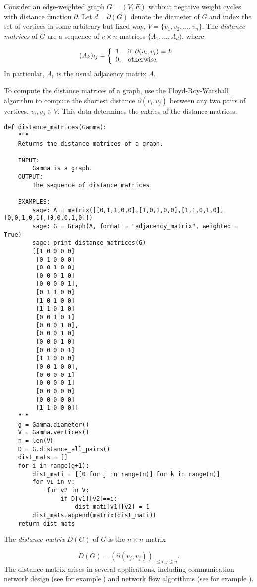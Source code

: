 Consider an edge-weighted graph $G=(V,E)$ without negative weight
cycles with distance function $\partial$. Let $d=\partial(G)$
denote the diameter of $G$ and index the
set of vertices in some arbitrary but fixed way,
$V=\{v_1,v_2,\dots, v_n\}$.
The {\it distance matrices} of $G$ are a sequence of $n\times n$ matrices
$\{A_1,\dots, A_d)$, where

\[
(A_k)_{ij} =
\left\{
\begin{array}{ll}
1,& {\rm if}\ \partial(v_i,v_j)=k,\\
0,& {\rm otherwise}.
\end{array}
\right.
\]
In particular, $A_1$ is the usual adjacency matrix $A$.

To compute the distance matrices of a graph, use the Floyd-Roy-Warshall
algorithm to compute the shortest distance
$\partial(v_i,v_j)$ between any two pairs of vertices,
$v_i,v_j\in V$. This data determines the entries of
the distance matrices.

\begin{lstlisting}
def distance_matrices(Gamma):
    """
    Returns the distance matrices of a graph.

    INPUT:
        Gamma is a graph.
    OUTPUT:
        The sequence of distance matrices

    EXAMPLES:
        sage: A = matrix([[0,1,1,0,0],[1,0,1,0,0],[1,1,0,1,0],[0,0,1,0,1],[0,0,0,1,0]])
        sage: G = Graph(A, format = "adjacency_matrix", weighted = True)
        sage: print distance_matrices(G)
        [[1 0 0 0 0]
         [0 1 0 0 0]
         [0 0 1 0 0]
         [0 0 0 1 0]
         [0 0 0 0 1],
         [0 1 1 0 0]
         [1 0 1 0 0]
         [1 1 0 1 0]
         [0 0 1 0 1]
         [0 0 0 1 0],
         [0 0 0 1 0]
         [0 0 0 1 0]
         [0 0 0 0 1]
         [1 1 0 0 0]
         [0 0 1 0 0],
         [0 0 0 0 1]
         [0 0 0 0 1]
         [0 0 0 0 0]
         [0 0 0 0 0]
         [1 1 0 0 0]]
    """
    g = Gamma.diameter()
    V = Gamma.vertices()
    n = len(V)
    D = G.distance_all_pairs()
    dist_mats = []
    for i in range(g+1):
        dist_mati = [[0 for j in range(n)] for k in range(n)]
        for v1 in V:
            for v2 in V:
                if D[v1][v2]==i:
                    dist_mati[v1][v2] = 1
        dist_mats.append(matrix(dist_mati))
    return dist_mats
\end{lstlisting}

The {\it distance matrix} $D(G)$ of $G$ is
the $n\times n$ matrix

\[
D(G)=(\partial(v_j,v_j))_{1\leq i,j\leq n}.
\]
The distance matrix arises in several applications, including
communication network design (see for example
\cite{GrahamPollak1971})
and network flow algorithms (see for example \cite{Dijkstra1959}).

